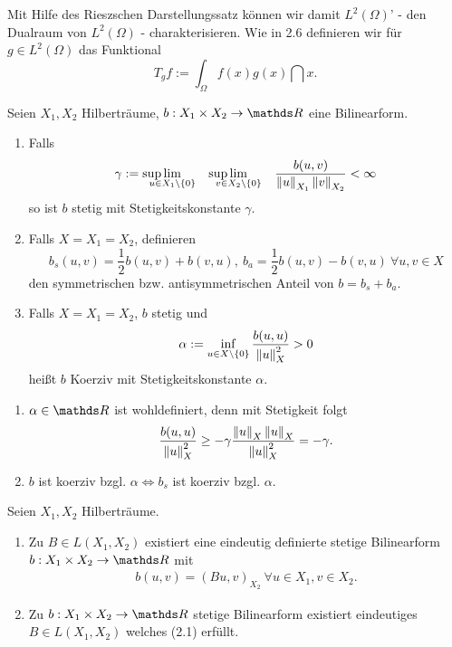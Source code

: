 Mit Hilfe des Rieszschen Darstellungssatz können wir damit $L^2(\Omega)$' - den Dualraum von $L^2(\Omega)$ - charakterisieren.
Wie in 2.6 definieren wir für $g\in L^2(\Omega)$ das Funktional
\[
T_g f := \int_{\Omega} f(x)g(x)\dint x.
\]

Seien $X_1,X_2$ Hilberträume, $b:X_1\times X_2 \to \R$ eine Bilinearform.
\begin{enumerate}[(1)]
	\item Falls 
	\[
	\gamma:= \sup\lim\ablim{u\in X_1\backslash\{0\}} \qquad\sup\lim\ablim{v\in X_2\backslash\{0\}}\qquad \frac{b(u,v)}{\norm{u}_{X_1}\norm{v}_{X_2}} < \infty
 	\]
 	so ist $b$ stetig mit Stetigkeitskonstante $\gamma$.
 	\item Falls $X=X_1=X_2$, definieren 
 	\[
 	b_s(u,v) = \frac{1}{2} b(u,v)+b(v,u),~b_a = \frac{1}{2} b(u,v)-b(v,u) ~\forall u,v\in X
 	\]
 	den symmetrischen bzw. antisymmetrischen Anteil von $b = b_s +b_a$.
 	\item Falls $X=X_1=X_2$, $b$ stetig und 
 	\[
 	\alpha := \inf\limits_{u\in X\backslash\{0\}} \frac{b(u,u)}{\left\Vert u\right\Vert_X^2} > 0
 	\]
 	heißt $b$ Koerziv mit Stetigkeitskonstante $\alpha$.
\end{enumerate}

\begin{enumerate}[(1)]
	\item $\alpha \in\R$ ist wohldefiniert, denn mit Stetigkeit folgt
	\[
	\frac{b(u,u)}{\left\Vert u\right\Vert_X^2} \ge -\gamma \frac{\left\Vert u\right\Vert_X\left\Vert u\right\Vert_X}{\left\Vert u\right\Vert_X^2} = -\gamma.
	\]
	\item $b$ ist koerziv bzgl. $\alpha \Leftrightarrow b_s$ ist koerziv bzgl. $\alpha$.
\end{enumerate}

Seien $X_1,X_2$ Hilberträume.
\begin{enumerate}[(1)]
	\item Zu $B\in L(X_1,X_2)$ existiert eine eindeutig definierte stetige Bilinearform $b:X_1\times X_2\to \R$ mit 
	\begin{align}
	b(u,v) = (Bu,v)_{X_2} ~\forall u\in X_1,v\in X_2.
	\end{align}
	\item Zu $b:X_1\times X_2 \to \R$ stetige Bilinearform existiert eindeutiges $B\in L(X_1,X_2)$ welches (2.1) erfüllt.
\end{enumerate}

